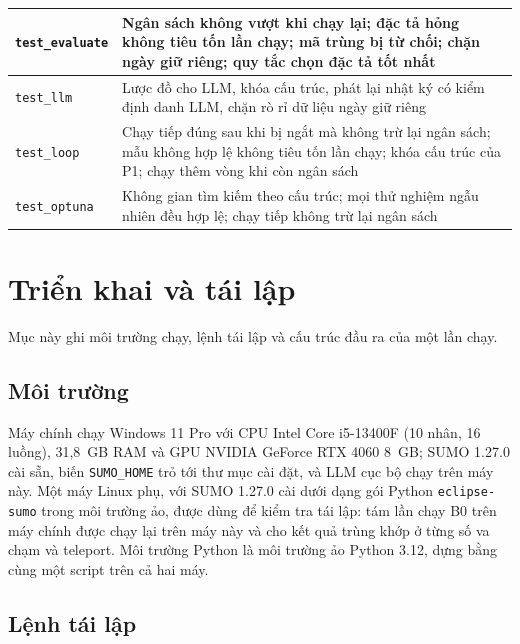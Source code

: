 \documentclass[../main.tex]{subfiles}
\begin{document}
\begin{table}[!htbp]
\begin{tabular}{|>{\raggedright\arraybackslash}p{3.6cm}|>{\raggedright\arraybackslash}p{9.4cm}|}
\texttt{test\_evaluate} & Ngân sách không vượt khi chạy lại; đặc tả hỏng không tiêu tốn lần chạy; mã trùng bị từ chối; chặn ngày giữ riêng; quy tắc chọn đặc tả tốt nhất \\ \hline
\texttt{test\_llm} & Lược đồ cho LLM, khóa cấu trúc, phát lại nhật ký có kiểm định danh LLM, chặn rò rỉ dữ liệu ngày giữ riêng \\ \hline
\texttt{test\_loop} & Chạy tiếp đúng sau khi bị ngắt mà không trừ lại ngân sách; mẫu không hợp lệ không tiêu tốn lần chạy; khóa cấu trúc của P1; chạy thêm vòng khi còn ngân sách \\ \hline
\texttt{test\_optuna} & Không gian tìm kiếm theo cấu trúc; mọi thử nghiệm ngẫu nhiên đều hợp lệ; chạy tiếp không trừ lại ngân sách \\ \hline
\end{tabular}
\end{table}

\section{Triển khai và tái lập}
\label{section:deploy}

Mục này ghi môi trường chạy, lệnh tái lập và cấu trúc đầu ra của một lần chạy.

\subsection{Môi trường}

Máy chính chạy Windows 11 Pro với CPU Intel Core i5-13400F (10 nhân, 16 luồng), 31,8~GB RAM và GPU NVIDIA GeForce RTX 4060 8~GB; SUMO 1.27.0 cài sẵn, biến \texttt{SUMO\_HOME} trỏ tới thư mục cài đặt, và LLM cục bộ chạy trên máy này. Một máy Linux phụ, với SUMO 1.27.0 cài dưới dạng gói Python \texttt{eclipse-sumo} trong môi trường ảo, được dùng để kiểm tra tái lập: tám lần chạy B0 trên máy chính được chạy lại trên máy này và cho kết quả trùng khớp ở từng số va chạm và teleport. Môi trường Python là môi trường ảo Python 3.12, dựng bằng cùng một script trên cả hai máy.

\subsection{Lệnh tái lập}
\end{document}
